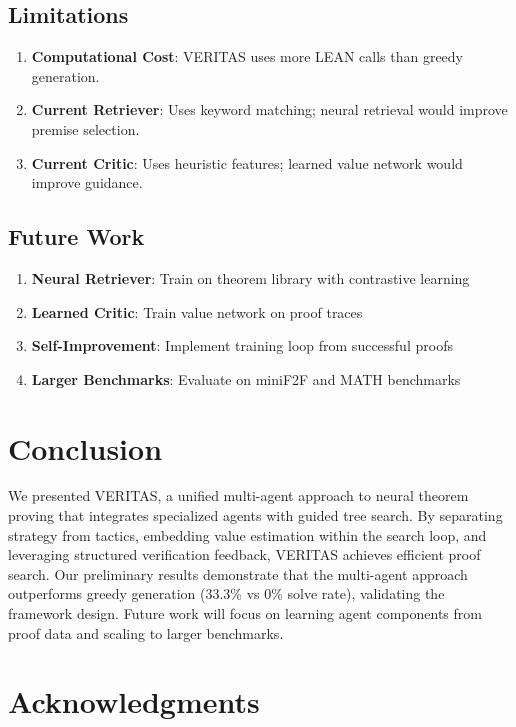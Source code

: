 \documentclass[11pt]{article}
\begin{document}
\subsection{Limitations}

\begin{enumerate}
    \item \textbf{Computational Cost}: VERITAS uses more LEAN calls than greedy generation.
    \item \textbf{Current Retriever}: Uses keyword matching; neural retrieval would improve premise selection.
    \item \textbf{Current Critic}: Uses heuristic features; learned value network would improve guidance.
\end{enumerate}

\subsection{Future Work}

\begin{enumerate}
    \item \textbf{Neural Retriever}: Train on theorem library with contrastive learning
    \item \textbf{Learned Critic}: Train value network on proof traces
    \item \textbf{Self-Improvement}: Implement training loop from successful proofs
    \item \textbf{Larger Benchmarks}: Evaluate on miniF2F and MATH benchmarks
\end{enumerate}

\section{Conclusion}

We presented VERITAS, a unified multi-agent approach to neural theorem proving that integrates specialized agents with guided tree search. By separating strategy from tactics, embedding value estimation within the search loop, and leveraging structured verification feedback, VERITAS achieves efficient proof search. Our preliminary results demonstrate that the multi-agent approach outperforms greedy generation (33.3\% vs 0\% solve rate), validating the framework design. Future work will focus on learning agent components from proof data and scaling to larger benchmarks.

\section*{Acknowledgments}
\end{document}
